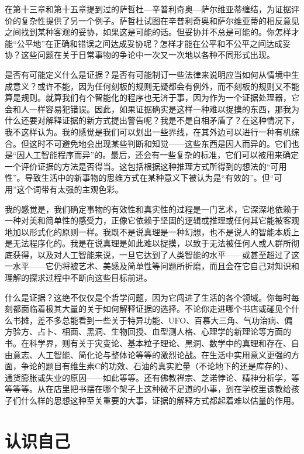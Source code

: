 在第十三章和第十五章提到过的萨哲杜—辛普利奇奥—萨尔维亚蒂缠结，为证据评价的复杂性提供了另一个例子。萨哲杜试图在辛普利奇奥和萨尔维亚蒂的相反意见之间找到某种客观的妥协，如果这是可能的话。但妥协并不总是可能的。你怎样才能“公平地”在正确和错误之间达成妥协呢？怎样才能在公平和不公平之间达成妥协？这些问题在关于日常事物的争论中一次又一次地以各种不同形式出现。

是否有可能定义什么是证据？是否有可能制订一些法律来说明应当如何从情境中生成意义？或许不能，因为任何刻板的规则无疑都会有例外，而不刻板的规则又不能算是规则。就算我们有个智能化的程序也无济于事，因为作为一个证据处理器，它会和人一样容易犯错误。因此，如果证据确实是这样一种难以捉摸的东西，那我为什么还要对解释证据的新方式提出警告呢？我是不是自相矛盾了？在这种情况下，我不这样认为。我的感觉是我们可以划出一些界线，在其外边可以进行一种有机综合。但这时不可避免地会出现某些判断和知觉——这些东西是因人而异的。它们也是“因人工智能程序而异”的。最后，还会有一些复杂的标准，它们可以被用来确定一个评价证据的方法是否得当。这包括根据这种推理方式所得到的想法的“可用性”。导致生活中的新事物的思维方式在某种意义下被认为是“有效的”。但“可用”这个词带有太强的主观色彩。

我的感觉是，我们确定事物的有效性和真实性的过程是一门艺术，它深深地依赖于一种对美和简单性的感受力，正像它依赖于坚固的逻辑或推理或任何其它能被客观地加以形式化的原则一样。我既不是说真理是一种幻想，也不是说人的智能本质上是无法程序化的。我是在说真理是如此难以捉摸，以致于无法被任何人或人群所彻底获得，以及对人工智能来说，一旦它达到了人类智能的水平——或甚至超过了这一水平——它仍将被艺术、美感及简单性等问题所折磨，而且会在它自己对知识和理解的探求过程中不断向这些目标前进。

什么是证据？这绝不仅仅是个哲学问题，因为它闯进了生活的各个领域。你每时每刻都面临着极其大量的关于如何解释证据的选择。不论你走进哪个书店或碰见个什么书摊，差不多总能看到一些关于特异功能、UFO、百慕大三角、气功治病、偏方验方、占卜、相面、黑洞、生物回授、血型测人格、心理学的新理论等方面的书。在科学界，则有关于灾变论、基本粒子理论、黑洞、数学中的真理和存在、自由意志、人工智能、简化论与整体论等等的激烈论战。在生活中实用意义更强的方面，争论的题目有维生素C的功效、石油的真实贮量（不论地下的还是库存的）、通货膨胀或失业的原因——如此等等。还有佛教禅宗、芝诺悖论、精神分析学，等等等等。从在店里把书摆在哪个架子上这种微不足道的小事，到在学校里该教给孩子们什么样的思想这种至关重要的大事，证据的解释方式都起着难以估量的作用。

\section{认识自己}

